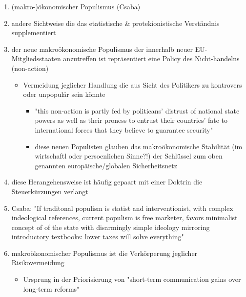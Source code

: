\documentclass[11pt]{article}
\begin{document}
\begin{enumerate}
\item (makro-)ökonomischer Populismus (Csaba)
\item andere Sichtweise die das etatistische \& protekionistische Verständnis supplementiert
\item der neue makroökonomische Populismus der innerhalb neuer EU-Mitgliedsstaaten anzutreffen ist repräsentiert eine Policy des Nicht-handelns (non-action)
\begin{itemize}
\item Vermeidung jeglicher Handlung die aus Sicht des Politikers zu kontrovers oder unpopulär sein könnte
\begin{itemize}
\item "this non-action is partly fed by politicans' distrust of national state powers as well as their proness to entrust their countries' fate to international forces that they believe to guarantee security"
\item diese neuen Populisten glauben das makroökonomische Stabilität (im wirtschaftl oder persoenlichen Sinne?!) der Schlüssel zum oben genannten europäische/globalen Sicherheitsnetz
\end{itemize}
\end{itemize}
\item diese Herangehensweise ist häufig gepaart mit einer Doktrin die Steuerkürzungen verlangt
\item Csaba: "If traditonal populism is statist and interventionist, with complex indeological references, current populism is free marketer, favors minimalist concept of of the state with disarmingly simple ideology mirroring introductory textbooks: lower taxes will solve everything"
\item makroökonomischer Populismus ist die Verkörperung jeglicher Risikovermeidung
\begin{itemize}
\item Ursprung in der Priorisierung von "short-term communication gains over long-term reforms"
\end{itemize}
\end{enumerate}
\end{document}
